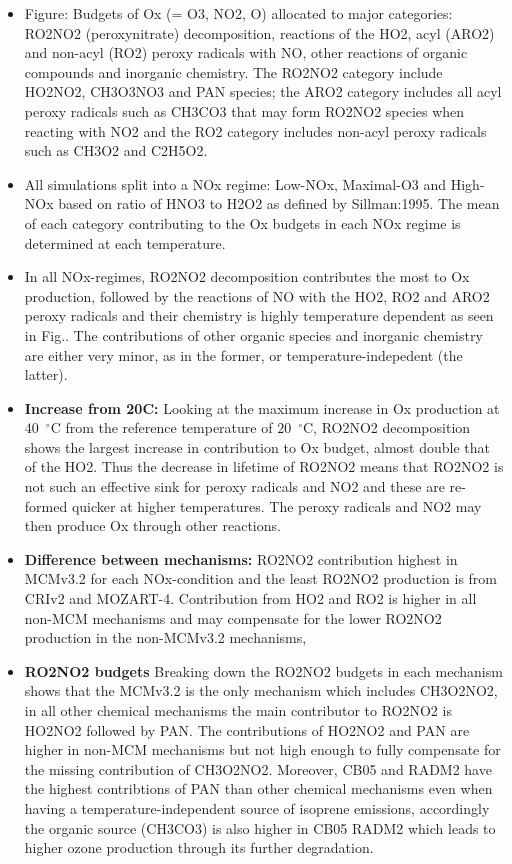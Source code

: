 \documentclass[11pt,a4paper]{article}
\begin{document}
\begin{itemize}
    \item Figure: Budgets of Ox (= O3, NO2, O) allocated to major categories: RO2NO2 (peroxynitrate) decomposition, reactions of the HO2, acyl (ARO2) and non-acyl (RO2) peroxy radicals with NO, other reactions of organic compounds and inorganic chemistry. The RO2NO2 category include HO2NO2, CH3O3NO3 and PAN species; the ARO2 category includes all acyl peroxy radicals such as CH3CO3 that may form RO2NO2 species when reacting with NO2 and the RO2 category includes non-acyl peroxy radicals such as CH3O2 and C2H5O2.
    \item All simulations split into a NOx regime: Low-NOx, Maximal-O3 and High-NOx based on ratio of HNO3 to H2O2 as defined by Sillman:1995. The mean of each category contributing to the Ox budgets in each NOx regime is determined at each temperature.
    \item In all NOx-regimes, RO2NO2 decomposition contributes the most to Ox production, followed by the reactions of NO with the HO2, RO2 and ARO2 peroxy radicals and their chemistry is highly temperature dependent as seen in Fig.. The contributions of other organic species and inorganic chemistry are either very minor, as in the former, or temperature-indepedent (the latter).
    \item \textbf{Increase from 20C:} Looking at the maximum increase in Ox production at $40$~$^{\circ}$C from the reference temperature of $20$~$^{\circ}$C, RO2NO2 decomposition shows the largest increase in contribution to Ox budget, almost double that of the HO2. Thus the decrease in lifetime of RO2NO2 means that RO2NO2 is not such an effective sink for peroxy radicals and NO2 and these are re-formed quicker at higher temperatures. The peroxy radicals and NO2 may then produce Ox through other reactions.
    \item \textbf{Difference between mechanisms:} RO2NO2 contribution highest in MCMv3.2 for each NOx-condition and the least RO2NO2 production is from CRIv2 and MOZART-4. Contribution from HO2 and RO2 is higher in all non-MCM mechanisms and may compensate for the lower RO2NO2 production in the non-MCMv3.2 mechanisms,
    \item \textbf{RO2NO2 budgets} Breaking down the RO2NO2 budgets in each mechanism shows that the MCMv3.2 is the only mechanism which includes CH3O2NO2, in all other chemical mechanisms the main contributor to RO2NO2 is HO2NO2 followed by PAN. The contributions of HO2NO2 and PAN are higher in non-MCM mechanisms but not high enough to fully compensate for the missing contribution of CH3O2NO2. Moreover, CB05 and RADM2 have the highest contribtions of PAN than other chemical mechanisms even when having a temperature-independent source of isoprene emissions, accordingly the organic source (CH3CO3) is also higher in CB05 RADM2 which leads to higher ozone production through its further degradation.
\end{itemize}
\end{document}
